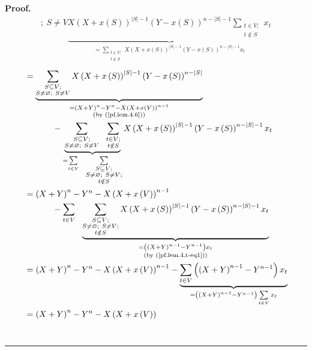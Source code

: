 \documentclass[numbers=enddot,12pt,final,onecolumn,notitlepage]{scrartcl}%
\theoremstyle{definition}
\newenvironment{proof}[1][Proof]{\noindent\textbf{#1.} }{\ \rule{0.5em}{0.5em}}
\let\sumnonlimits\sum
\renewcommand{\sum}{\sumnonlimits\limits}
\newenvironment{verlong}{}{}
\begin{document}
\begin{verlong}
\begin{proof}
\begin{align*}
{{;\ S\neq V}}\underbrace{X\left(  X+x\left(  S\right)  \right)  ^{\left\vert
S\right\vert -1}\left(  Y-x\left(  S\right)  \right)  ^{n-\left\vert
S\right\vert -1}\sum_{\substack{t\in V;\\t\notin S}}x_{t}}_{=\sum
_{\substack{t\in V;\\t\notin S}}X\left(  X+x\left(  S\right)  \right)
^{\left\vert S\right\vert -1}\left(  Y-x\left(  S\right)  \right)
^{n-\left\vert S\right\vert -1}x_{t}}%
\end{align*}%
\begin{align*}
&  =\underbrace{\sum_{\substack{S\subseteq V;\\S\neq\varnothing;\ S\neq
V}}X\left(  X+x\left(  S\right)  \right)  ^{\left\vert S\right\vert -1}\left(
Y-x\left(  S\right)  \right)  ^{n-\left\vert S\right\vert }}%
_{\substack{=\left(  X+Y\right)  ^{n}-Y^{n}-X\left(  X+x\left(  V\right)
\right)  ^{n-1}\\\text{(by (\ref{pf.lem.4.6}))}}}\\
&  \ \ \ \ \ \ \ \ \ \ -\underbrace{\sum_{\substack{S\subseteq V;\\S\neq
\varnothing;\ S\neq V}}\ \ \sum_{\substack{t\in V;\\t\notin S}}}_{=\sum_{t\in
V}\ \ \sum_{\substack{S\subseteq V;\\S\neq\varnothing;\ S\neq V;\\t\notin S}%
}}X\left(  X+x\left(  S\right)  \right)  ^{\left\vert S\right\vert -1}\left(
Y-x\left(  S\right)  \right)  ^{n-\left\vert S\right\vert -1}x_{t}\\
&  =\left(  X+Y\right)  ^{n}-Y^{n}-X\left(  X+x\left(  V\right)  \right)
^{n-1}\\
&  \ \ \ \ \ \ \ \ \ \ -\sum_{t\in V}\ \ \underbrace{\sum
_{\substack{S\subseteq V;\\S\neq\varnothing;\ S\neq V;\\t\notin S}}X\left(
X+x\left(  S\right)  \right)  ^{\left\vert S\right\vert -1}\left(  Y-x\left(
S\right)  \right)  ^{n-\left\vert S\right\vert -1}x_{t}}_{\substack{=\left(
\left(  X+Y\right)  ^{n-1}-Y^{n-1}\right)  x_{t}\\\text{(by
(\ref{pf.lem.4.t-eq1}))}}}\\
&  =\left(  X+Y\right)  ^{n}-Y^{n}-X\left(  X+x\left(  V\right)  \right)
^{n-1}-\underbrace{\sum_{t\in V}\left(  \left(  X+Y\right)  ^{n-1}%
-Y^{n-1}\right)  x_{t}}_{=\left(  \left(  X+Y\right)  ^{n-1}-Y^{n-1}\right)
\sum_{t\in V}x_{t}}\\
&  =\left(  X+Y\right)  ^{n}-Y^{n}-X\left(  X+x\left(  V\right)  \right)

\end{align*}
\end{proof}
\end{verlong}
\end{document}
